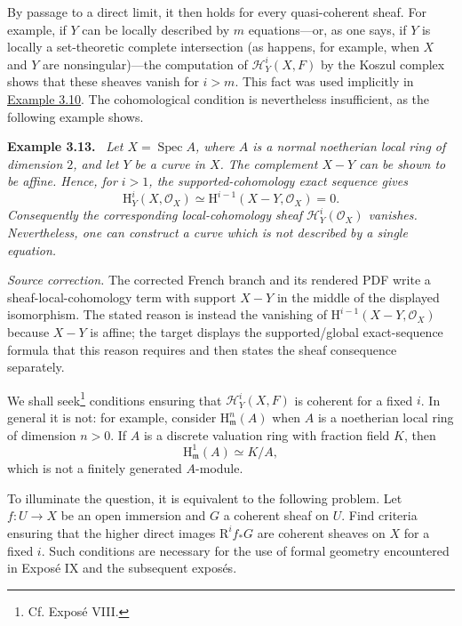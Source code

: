 \documentclass[11pt,a4paper,oneside]{book}
\providecommand{\srcpage}[1]{%
  \marginpar{\raggedright\scriptsize\color{gray}Original French p.~#1}}
\providecommand{\RR}{\mathrm R}
\providecommand{\cH}{\mathcal H}
\providecommand{\Spec}{\operatorname{Spec}}
\providecommand{\HH}{\mathrm H}
\newenvironment{sgastatement}[1]
  {\par\addvspace{0.8\baselineskip}\noindent\textbf{#1.}\ \itshape}
  {\par\addvspace{0.35\baselineskip}}
\theoremstyle{plain}
\theoremstyle{definition}
\theoremstyle{remark}
\begin{document}
By passage to a direct limit, it then holds for every quasi-coherent sheaf.
For example, if $Y$ can be locally described by $m$ equations---or, as one
says, if $Y$ is locally a set-theoretic complete intersection (as happens,
for example, when $X$ and $Y$ are nonsingular)---the computation of
$\cH_Y^i(X,F)$ by the Koszul complex shows that these sheaves vanish for
$i>m$. This fact was used implicitly in \hyperref[III.3.10]{Example 3.10}. The cohomological
condition is nevertheless insufficient, as the following example shows.

\begin{sgastatement}{Example 3.13}\srcpage{42}
Let $X=\Spec A$, where $A$ is a normal noetherian local ring of dimension
$2$, and let $Y$ be a curve in $X$. The complement $X-Y$ can be shown to be
affine. Hence, for $i>1$, the supported-cohomology exact sequence gives
\[
  \HH_Y^i(X,\mathcal O_X)
  \simeq \HH^{i-1}(X-Y,\mathcal O_X)=0.
\]
Consequently the corresponding local-cohomology sheaf
$\cH_Y^i(\mathcal O_X)$ vanishes. Nevertheless, one can construct a curve
which is not described by a single equation.
\end{sgastatement}

\noindent\textit{Source correction.} The corrected French branch and its
rendered PDF write a sheaf-local-cohomology term with support $X-Y$ in the
middle of the displayed isomorphism. The stated reason is instead the
vanishing of $\HH^{i-1}(X-Y,\mathcal O_X)$ because $X-Y$ is affine; the
target displays the supported/global exact-sequence formula that this reason
requires and then states the sheaf consequence separately.

We shall seek\footnote{Cf. Expos\'e VIII.} conditions ensuring that
$\cH_Y^i(X,F)$ is coherent for a fixed $i$. In general it is not: for
example, consider $\HH_{\mathfrak m}^n(A)$ when $A$ is a noetherian local
ring of dimension $n>0$. If $A$ is a discrete valuation ring with fraction
field $K$, then
\[
  \HH_{\mathfrak m}^1(A)\simeq K/A,
\]
which is not a finitely generated $A$-module.

To illuminate the question, it is equivalent to the following problem. Let
$f:U\to X$ be an open immersion and $G$ a coherent sheaf on $U$. Find
criteria ensuring that the higher direct images $\RR^i f_*G$ are coherent
sheaves on $X$ for a fixed $i$. Such conditions are necessary for the use of
formal geometry encountered in Expos\'e IX and the subsequent expos\'es.

\end{document}
